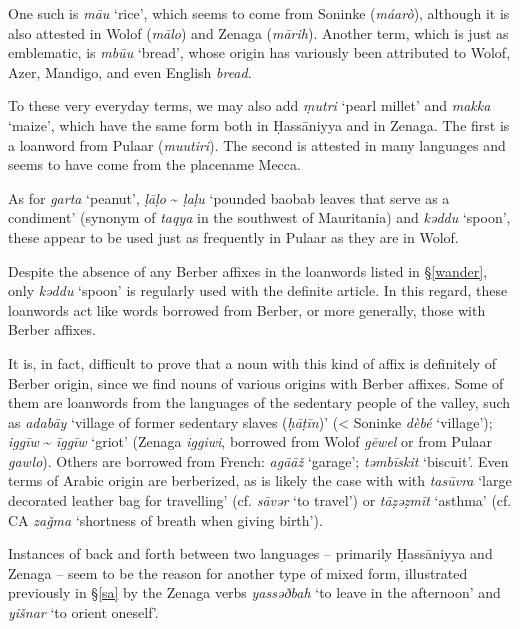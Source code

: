 \documentclass[output=paper]{langsci/langscibook}
\begin{document}
One such is \textit{mā{\R}u} ‘rice’, which seems to come from Soninke (\textit{máarò}), although it is also attested in Wolof (\textit{mālo}) and Zenaga (\textit{mārih}). Another term, which is just as emblematic, is \textit{mbū{\R}u} ‘bread’, whose origin has variously been attributed to Wolof, Azer, Mandigo, and even English \textit{bread}.

To these very everyday terms, we may also add \textit{ṃutri} ‘pearl millet’ and \textit{makka} ‘maize’, which have the same form both in Ḥassāniyya and in Zenaga. The first is a loanword from Pulaar (\textit{muutiri}). The second is attested in many languages and seems to have come from the placename Mecca. 

As for \textit{garta} ‘peanut’, \textit{ḷāḷo} \~{} \textit{ḷaḷu} ‘pounded baobab leaves that serve as a condiment’ (synonym of \textit{taqya} in the southwest of Mauritania) and \textit{kəddu} ‘spoon’, these appear to be used just as frequently in Pulaar as they are in Wolof. 


Despite the absence of any Berber affixes in the loanwords listed in §\ref{wander}, only \textit{kəddu} ‘spoon’ is regularly used with the definite article. In this regard, these loanwords act like words borrowed from Berber, or more generally, those with Berber affixes. 

It is, in fact, difficult to prove that a noun with this kind of affix is definitely of Berber origin, since we find nouns of various origins with Berber affixes. Some of them are loanwords from the languages of the sedentary people of the valley, such as \textit{adabāy} ‘village of former sedentary slaves (\textit{ḥ{\R}āṭīn})’ (< Soninke \textit{dèbé} ‘village’); \textit{iggīw} \~{} \textit{īggīw} ‘griot’ (Zenaga \textit{iggiwi}, borrowed from Wolof \textit{gēwel} or from Pulaar \textit{gawlo}). Others are borrowed from French: \textit{agā{\R}āž} ‘garage’; \textit{təmbīskit} ‘biscuit’. Even terms of Arabic origin are berberized, as is likely the case with with \textit{tasūvra} ‘large decorated leather bag for travelling’ (cf. \textit{sāvər} ‘to travel’) or \textit{tāẓəẓmīt} ‘asthma’ (cf. CA \textit{zaǧma} ‘shortness of breath when giving birth’).


Instances of back and forth between two languages – primarily Ḥassāniyya and Zenaga – seem to be the reason for another type of mixed form, illustrated previously in §\ref{sa} by the Zenaga verbs \textit{yassəðbah} ‘to leave in the afternoon’ and \textit{yišnar} ‘to orient oneself’.
\end{document}
